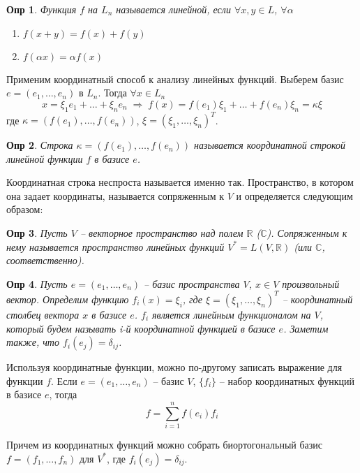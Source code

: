 \documentclass[a4paper,12pt]{article}
\newtheorem*{definition}{Опр}
\begin{document}
\begin{definition}
	Функция $f$ на $L_n$ называется линейной, если $\forall x,y \in L$, $\forall \alpha$
	\begin{enumerate}
		\item $f(x+y) = f(x) + f(y)$
		\item $f(\alpha x) =\alpha f(x)$
	\end{enumerate}
\end{definition}

Применим координатный способ к анализу линейных функций. Выберем базис $e = (e_1, \ldots, e_n)$ в $L_n$. Тогда $\forall x \in L_n$
\[
	x = \xi_1 e_1 + \ldots + \xi_n e_n \; \Rightarrow \; f(x) =  f(e_1) \xi_1 + \ldots +  f(e_n) \xi_n = \kappa \xi
\]
где $\kappa = (f(e_1), \ldots, f(e_n))$, $\xi = (\xi_1, \ldots, \xi_n)^T$.

\begin{definition}
	Строка $\kappa = (f(e_1), \ldots, f(e_n))$ называется координатной строкой линейной функции $f$ в базисе $e$.
\end{definition}

Координатная строка неспроста называется именно так. Пространство, в котором она задает координаты, называется сопряженным к $V$ и определяется следующим образом:

\begin{definition}
	Пусть $V$ -- векторное пространство над полем $\mathbb{R}$ ($\mathbb{C}$). Сопряженным к нему называется пространство линейных функций $V^* = L(V, \mathbb{R})$ (или $\mathbb{C}$, соответственно).
\end{definition}


\begin{definition}
	 Пусть $e = (e_1, \ldots, e_n)$ -- базис пространства $V$, $x \in V$ произвольный вектор. Определим функцию $f_i(x) = \xi_i$, где $\xi = (\xi_1, \ldots, \xi_n)^T$ -- координатный столбец вектора $x$ в базисе $e$. $f_i$ является линейным функционалом на $V$, который будем называть i-й координатной функцией в базисе $e$. Заметим также, что $f_i(e_j) = \delta_{ij}$.
\end{definition}

Используя координатные функции, можно по-другому записать выражение для функции $f$. Если $e = (e_1, \ldots, e_n)$ -- базис $V$, $\{f_i\}$ -- набор координатных функций в базисе $e$, тогда 
\[
	f = \sum_{i=1}^{n}  f(e_i) f_i
\]

Причем из координатных функций можно собрать биортогональный базис $f=(f_1, \ldots, f_n)$ для $V^*$, где $f_i(e_j) = \delta_{ij}$.
\end{document}
